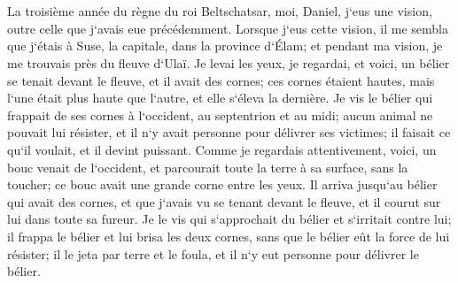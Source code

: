 \chapter{}

\verse La troisième année du règne du roi Beltschatsar, moi, Daniel, j`eus une vision, outre celle que j`avais eue précédemment. 
\verse Lorsque j`eus cette vision, il me sembla que j`étais à Suse, la capitale, dans la province d`Élam; et pendant ma vision, je me trouvais près du fleuve d`Ulaï. 
\verse Je levai les yeux, je regardai, et voici, un bélier se tenait devant le fleuve, et il avait des cornes; ces cornes étaient hautes, mais l`une était plus haute que l`autre, et elle s`éleva la dernière. 
\verse Je vis le bélier qui frappait de ses cornes à l`occident, au septentrion et au midi; aucun animal ne pouvait lui résister, et il n`y avait personne pour délivrer ses victimes; il faisait ce qu`il voulait, et il devint puissant. 
\verse Comme je regardais attentivement, voici, un bouc venait de l`occident, et parcourait toute la terre à sa surface, sans la toucher; ce bouc avait une grande corne entre les yeux. 
\verse Il arriva jusqu`au bélier qui avait des cornes, et que j`avais vu se tenant devant le fleuve, et il courut sur lui dans toute sa fureur. 
\verse Je le vis qui s`approchait du bélier et s`irritait contre lui; il frappa le bélier et lui brisa les deux cornes, sans que le bélier eût la force de lui résister; il le jeta par terre et le foula, et il n`y eut personne pour délivrer le bélier. 
